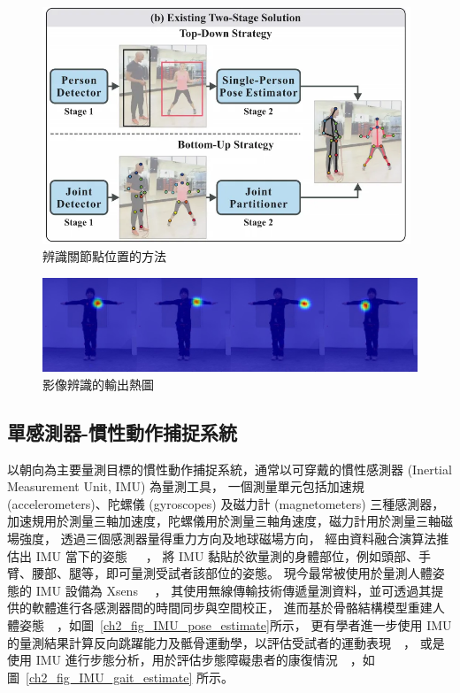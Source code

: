 \begin{figure}[!ht]
    \centering
    \includegraphics[width=11cm]{figure/ch2_fig_topvsbottom.png}
     \caption[辨識關節點位置的方法 ~\cite{nie2019single}]{辨識關節點位置的方法 ~\cite{nie2019single}}
     \label{ch2_fig_topvsbottom}
\end{figure}

\begin{figure}[!ht]
    \centering
    \includegraphics[width=\linewidth]{figure/ch2_fig_heatmap.jpg}
     \caption[影像辨識的輸出熱圖]{影像辨識的輸出熱圖}
     \label{ch2_fig_heatmap}
\end{figure}

\subsection{單感測器-慣性動作捕捉系統}
以朝向為主要量測目標的慣性動作捕捉系統，通常以可穿戴的慣性感測器 (Inertial Measurement Unit, IMU) 為量測工具，
一個測量單元包括加速規 (accelerometers)、陀螺儀 (gyroscopes) 及磁力計 (magnetometers) 三種感測器，
加速規用於測量三軸加速度，陀螺儀用於測量三軸角速度，磁力計用於測量三軸磁場強度，
透過三個感測器量得重力方向及地球磁場方向，
經由資料融合演算法推估出 IMU 當下的姿態~\cite{young2009comparison}~\cite{madgwick2011estimation}~\cite{nazarahari202140}，
將 IMU 黏貼於欲量測的身體部位，例如頭部、手臂、腰部、腿等，即可量測受試者該部位的姿態。
現今最常被使用於量測人體姿態的 IMU 設備為 Xsens ~\cite{roetenberg2009xsens}~\cite{paulich2018xsens}，
其使用無線傳輸技術傳遞量測資料，並可透過其提供的軟體進行各感測器間的時間同步與空間校正，
進而基於骨骼結構模型重建人體姿態~\cite{mcgrath2020body}~\cite{DIP:SIGGRAPHAsia:2018}，如圖~\ref{ch2_fig_IMU_pose_estimate}所示，
更有學者進一步使用 IMU 的量測結果計算反向跳躍能力及骶骨運動學，以評估受試者的運動表現~\cite{mcginnis2016quantifying}~\cite{miranda2022accuracy}，
或是使用 IMU 進行步態分析，用於評估步態障礙患者的康復情況~\cite{wang2020imu}~\cite{uchitomi2022three}，如圖~\ref{ch2_fig_IMU_gait_estimate} 所示。


